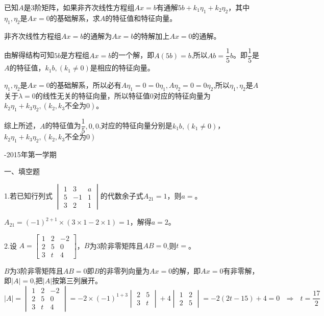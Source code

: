 \documentclass{article}
\begin{document}
已知$A$是3阶矩阵，如果非齐次线性方程组$Ax=b$有通解$5b+k_1\eta_1+k_2\eta_2$，其中$\eta_1,\eta_2$是$Ax=0$的基础解系，求$A$的特征值和特征向量。

\begin{jie}
\textcolor[rgb]{1.00,0.00,0.00}{非齐次线性方程组$Ax=b$的通解为$Ax=b$的特解加上$Ax=0$的通解。}

由解得结构可知$5b$是方程组$Ax=b$的一个解，即$A(5b)=b$,所以$Ab=\dfrac{1}{5}b$。即$\dfrac{1}{5}$是$A$的特征值，$k_1b,(k_1\neq 0)$是相应的特征向量。

$\eta_1,\eta_2$是$Ax=0$的基础解系，所以必有$A\eta_1=0=0\eta_1,A\eta_{2}=0=0\eta_2$,所以$\eta_1,\eta_2$是$A$关于$\lambda=0$的线性无关的特征向量，所以特征值$0$对应的特征向量为$k_2\eta_1+k_3\eta_2,(k_2,k_3\text{不全为}0)$。

综上所述，$A$的特征值为$\dfrac{1}{5},0,0$,对应的特征向量分别是$k_1b,(k_1\neq 0)$，$k_2\eta_1+k_3\eta_2,(k_2,k_3\text{不全为}0)$
\end{jie}
\newpage
\hphantom{~~}\hfill {-2015年第一学期} \hfill\hphantom{~~}

一、填空题

1.若已知行列式
$
\begin{vmatrix}
  1 & 3 & a \\
  5 & -1 &1\\
  3 & 2&1
\end{vmatrix}
$的代数余子式$A_{21}=1$，则$a=$\underline{\hphantom{~~~~~~~~~~}}。

\begin{jie}
$A_{21}=(-1)^{2+1}\times(3\times 1-2\times 1)=1$，解得$a=2$。
\end{jie}

2.设
$
A=
\begin{bmatrix}
  1 & 2 & -2 \\
  2 & 5 &0\\
  3 & t&4
\end{bmatrix}
$，$B$为3阶非零矩阵且$AB=0$,则$t=$\underline{\hphantom{~~~~~~~~~~}}。

\begin{jie}
$B$为3阶非零矩阵且$AB=0$即$B$的非零列向量为$Ax=0$的解，即$Ax=0$有非零解，即$|A|=0$,把$|A|$按第三列展开。
\begin{equation*}
  |A|=
  \begin{vmatrix}
  1 & 2 & -2 \\
  2 & 5 &0\\
  3 & t&4
  \end{vmatrix}=-2\times(-1)^{1+3}
  \begin{vmatrix}
  2 & 5 \\
  3 & t
  \end{vmatrix}+4
  \begin{vmatrix}
  1 & 2  \\
  2 & 5
  \end{vmatrix}=-2(2t-15)+4=0~~~\Rightarrow~~~t=\frac{17}{2}
\end{equation*}
\end{jie}
\end{document}
